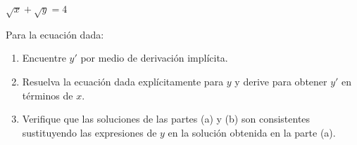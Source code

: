 \item $\sqrt{x} + \sqrt{y} = 4$
\par
Para la ecuación dada:
\begin{enumerate}
    \item[(a)] Encuentre $y'$ por medio de derivación implícita.
    \item[(b)] Resuelva la ecuación dada explícitamente para $y$ y derive para obtener $y'$ en términos de $x$.
    \item[(c)] Verifique que las soluciones de las partes (a) y (b) son consistentes sustituyendo las expresiones de $y$ en la solución obtenida en la parte (a).
\end{enumerate}
